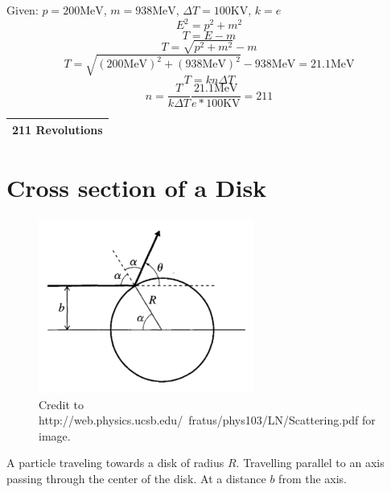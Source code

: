 \documentclass[12pt]{article}
\begin{document}
Given: $p = 200 \textrm{MeV}$, $m = 938 \textrm{MeV}$, $\Delta{T}=100\textrm{KV}$, $k=e$
\begin{equation}
E^2 = p^2 + m^2
\end{equation}
\begin{equation}
T = E - m
\end{equation}
\begin{equation}
T = \sqrt{p^2+m^2}  - m
\end{equation}
\begin{equation}
  T = \sqrt{(200 \textrm{MeV})^2+(938 \textrm{MeV})^2}  - 938 \textrm{MeV} = 21.1\textrm{MeV} 
\end{equation}
\begin{equation}
  T = kn\Delta{T}
\end{equation}
\begin{equation}
  n = \frac{T}{k\Delta{T}} \frac{21.1 \textrm{MeV}}{e*100\textrm{KV}}= 211
\end{equation}
\begin{table}[h]
  \centering
  \begin{tabular}{|c|}
    \hline
      \bf 211 Revolutions \\
    \hline
  \end{tabular}
\end{table}

\pagebreak
\section{Cross section of a Disk}

\begin{figure}[h]
  \centering
  \includegraphics[width=200pt]{disk_scatter.png}
  \caption{Credit to http://web.physics.ucsb.edu/~fratus/phys103/LN/Scattering.pdf for image.}
  \label{fig:disk}
\end{figure}

A particle traveling towards a disk of radius $R$. Travelling parallel to an axis passing through the center of the disk. At a distance $b$ from the axis.
\end{document}

